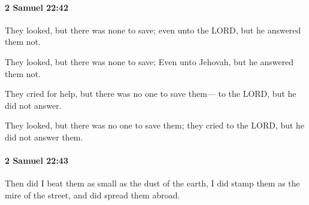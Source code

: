 		\paragraph{2 Samuel 22:42} %
			\label{2SAMUEL-22-42}

			They looked, but there was none to save; even unto the LORD, but he answered them not.

			\begin{versebox}
					\item[BHS] 
					\item[ASV] They looked, but there was none to save; Even unto Jehovah, but he answered them not.
					\item[NIV] They cried for help, but there was no one to save them— to the LORD, but he did not answer.
					\item[NRSV] They looked, but there was no one to save them; they cried to the LORD, but he did not answer them.
			\end{versebox}

		\paragraph{2 Samuel 22:43} %
			\label{2SAMUEL-22-43}

			Then did I beat them as small as the dust of the earth, I did stamp them as the mire of the street, and did spread them abroad.

